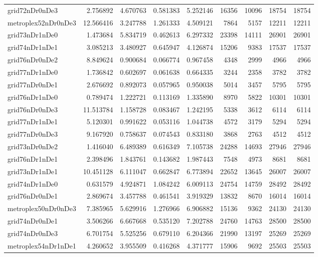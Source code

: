 \begin{longtable}{|l|r|r|r|r|r|r|r|r|}
grid72nDr0nDe3 & 2.756892 & 4.670763 & 0.581383 & 5.252146 & 16356 & 10096 & 18754 & 18754 \\
metroplex52nDr0nDe3 & 12.566416 & 3.247788 & 1.261333 & 4.509121 & 7864 & 5157 & 12211 & 12211 \\
grid73nDr1nDe0 & 1.473684 & 5.834719 & 0.462613 & 6.297332 & 23398 & 14111 & 26901 & 26901 \\
grid74nDr1nDe1 & 3.085213 & 3.480927 & 0.645947 & 4.126874 & 15206 & 9383 & 17537 & 17537 \\
grid76nDr0nDe2 & 8.849624 & 0.900684 & 0.066774 & 0.967458 & 4348 & 2999 & 4966 & 4966 \\
grid77nDr1nDe0 & 1.736842 & 0.602697 & 0.061638 & 0.664335 & 3244 & 2358 & 3782 & 3782 \\
grid77nDr0nDe1 & 2.676692 & 0.892073 & 0.057965 & 0.950038 & 5014 & 3457 & 5795 & 5795 \\
grid76nDr1nDe0 & 0.789474 & 1.222721 & 0.113169 & 1.335890 & 8970 & 5822 & 10301 & 10301 \\
grid76nDr0nDe3 & 11.513784 & 1.158728 & 0.083467 & 1.242195 & 5338 & 3612 & 6114 & 6114 \\
grid77nDr1nDe1 & 5.120301 & 0.991622 & 0.053116 & 1.044738 & 4572 & 3179 & 5294 & 5294 \\
grid77nDr0nDe3 & 9.167920 & 0.758637 & 0.074543 & 0.833180 & 3868 & 2763 & 4512 & 4512 \\
grid73nDr0nDe2 & 1.416040 & 6.489389 & 0.616349 & 7.105738 & 24288 & 14693 & 27946 & 27946 \\
grid76nDr1nDe1 & 2.398496 & 1.843761 & 0.143682 & 1.987443 & 7548 & 4973 & 8681 & 8681 \\
grid73nDr1nDe1 & 10.451128 & 6.111047 & 0.662847 & 6.773894 & 22652 & 13645 & 26007 & 26007 \\
grid74nDr1nDe0 & 0.631579 & 4.924871 & 1.084242 & 6.009113 & 24754 & 14759 & 28492 & 28492 \\
grid76nDr0nDe1 & 2.869674 & 3.457788 & 0.461541 & 3.919329 & 13832 & 8670 & 16014 & 16014 \\
metroplex50nDr0nDe3 & 7.385965 & 5.629916 & 1.276966 & 6.906882 & 15136 & 9362 & 24130 & 24130 \\
grid74nDr0nDe1 & 3.506266 & 6.667668 & 0.535120 & 7.202788 & 24760 & 14763 & 28500 & 28500 \\
grid74nDr0nDe3 & 6.701754 & 5.525256 & 0.679110 & 6.204366 & 21990 & 13197 & 25269 & 25269 \\
metroplex54nDr1nDe1 & 4.260652 & 3.955509 & 0.416268 & 4.371777 & 15906 & 9692 & 25503 & 25503 \\

\end{longtable}
